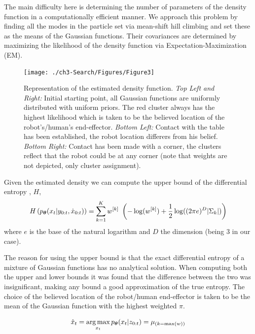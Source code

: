 The main difficulty here is determining the number of parameters of the density function in a computationally efficient manner.
We approach this problem by finding all the modes in the particle set via mean-shift hill climbing and set these as the 
means of the Gaussian functions. Their covariances are determined by maximizing the likelihood of the density function 
via Expectation-Maximization (EM). 
%
%

\begin{figure}
 \centering
   \texttt{[image: ./ch3-Search/Figures/Figure3]}
  \caption{Representation of the estimated density function. \textit{Top Left and Right:} Initial starting point, 
  all Gaussian functions are uniformly distributed with uniform priors. The red cluster always has the highest likelihood which is taken
  to be the believed location of the robot's/human's end-effector. \textit{Bottom Left:} Contact with the table has been established, the robot location differers
  from his belief. \textit{Bottom Right:} Contact has been made with a corner, the clusters reflect that the robot could be at any corner (note that weights are not 
  depicted, only cluster assignment).}
  \label{fig:clustering}
\end{figure}

Given the estimated density we can compute the upper bound of the differential entropy \cite{DiffEntropyHuber2008}, $H$,
\begin{equation}
  H\left(  p_{\boldsymbol{\theta}}(x_t|y_{0:t},\dot{x}_{0:t}) \right) = \sum\limits_{k=1}^{K} w^{[k]}\ \left( -\log(w^{[k]}) + \frac{1}{2} \log((2\pi e)^{D} |\Sigma_{k}|) \right)
\end{equation}
where $e$ is the base of the natural logarithm and $D$ the dimension (being 3 in our case).

The reason for using the upper bound is that the exact differential entropy of a mixture of Gaussian functions has no 
analytical solution. When computing both the
upper and lower bounds it was found that the difference between the two was insignificant, making any bound a good approximation 
of the true entropy. The choice of the believed location of the robot/human end-effector is taken to be the mean of the 
Gaussian function with the highest weighted $\pi$.

\begin{equation}
 \hat{x}_t = \operatorname*{arg\,max}_{x_t} p_{\boldsymbol{\theta}}(x_{t}|z_{0:t}) = \mu_{(k = \max(w))}
\end{equation}

